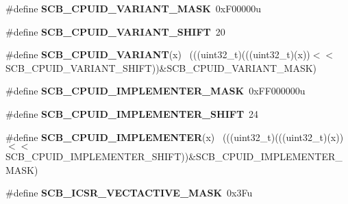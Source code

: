 \begin{DoxyCompactItemize}
\item 
\hypertarget{group___s_c_b___register___masks_ga42f96b8e820835b499d29a04e593d363}{}\#define {\bfseries S\+C\+B\+\_\+\+C\+P\+U\+I\+D\+\_\+\+V\+A\+R\+I\+A\+N\+T\+\_\+\+M\+A\+S\+K}~0x\+F00000u\label{group___s_c_b___register___masks_ga42f96b8e820835b499d29a04e593d363}

\item 
\hypertarget{group___s_c_b___register___masks_ga810d19688c9813a71a60087f8ad98b2f}{}\#define {\bfseries S\+C\+B\+\_\+\+C\+P\+U\+I\+D\+\_\+\+V\+A\+R\+I\+A\+N\+T\+\_\+\+S\+H\+I\+F\+T}~20\label{group___s_c_b___register___masks_ga810d19688c9813a71a60087f8ad98b2f}

\item 
\hypertarget{group___s_c_b___register___masks_ga5893cc47868f7ce5410fc210cb28e56f}{}\#define {\bfseries S\+C\+B\+\_\+\+C\+P\+U\+I\+D\+\_\+\+V\+A\+R\+I\+A\+N\+T}(x)                                      ~(((uint32\+\_\+t)(((uint32\+\_\+t)(x))$<$$<$S\+C\+B\+\_\+\+C\+P\+U\+I\+D\+\_\+\+V\+A\+R\+I\+A\+N\+T\+\_\+\+S\+H\+I\+F\+T))\&S\+C\+B\+\_\+\+C\+P\+U\+I\+D\+\_\+\+V\+A\+R\+I\+A\+N\+T\+\_\+\+M\+A\+S\+K)\label{group___s_c_b___register___masks_ga5893cc47868f7ce5410fc210cb28e56f}

\item 
\hypertarget{group___s_c_b___register___masks_gab1f83660e1dfa68aeccfed5a890725a9}{}\#define {\bfseries S\+C\+B\+\_\+\+C\+P\+U\+I\+D\+\_\+\+I\+M\+P\+L\+E\+M\+E\+N\+T\+E\+R\+\_\+\+M\+A\+S\+K}~0x\+F\+F000000u\label{group___s_c_b___register___masks_gab1f83660e1dfa68aeccfed5a890725a9}

\item 
\hypertarget{group___s_c_b___register___masks_ga6729af9d9ed3840dae99f10bb2feb44d}{}\#define {\bfseries S\+C\+B\+\_\+\+C\+P\+U\+I\+D\+\_\+\+I\+M\+P\+L\+E\+M\+E\+N\+T\+E\+R\+\_\+\+S\+H\+I\+F\+T}~24\label{group___s_c_b___register___masks_ga6729af9d9ed3840dae99f10bb2feb44d}

\item 
\hypertarget{group___s_c_b___register___masks_gab0fb7e28b04f21790b271cc997368c35}{}\#define {\bfseries S\+C\+B\+\_\+\+C\+P\+U\+I\+D\+\_\+\+I\+M\+P\+L\+E\+M\+E\+N\+T\+E\+R}(x)                              ~(((uint32\+\_\+t)(((uint32\+\_\+t)(x))$<$$<$S\+C\+B\+\_\+\+C\+P\+U\+I\+D\+\_\+\+I\+M\+P\+L\+E\+M\+E\+N\+T\+E\+R\+\_\+\+S\+H\+I\+F\+T))\&S\+C\+B\+\_\+\+C\+P\+U\+I\+D\+\_\+\+I\+M\+P\+L\+E\+M\+E\+N\+T\+E\+R\+\_\+\+M\+A\+S\+K)\label{group___s_c_b___register___masks_gab0fb7e28b04f21790b271cc997368c35}

\item 
\hypertarget{group___s_c_b___register___masks_ga5818ac6e0642a5053dd525d82623054b}{}\#define {\bfseries S\+C\+B\+\_\+\+I\+C\+S\+R\+\_\+\+V\+E\+C\+T\+A\+C\+T\+I\+V\+E\+\_\+\+M\+A\+S\+K}~0x3\+Fu\label{group___s_c_b___register___masks_ga5818ac6e0642a5053dd525d82623054b}


\end{DoxyCompactItemize}
